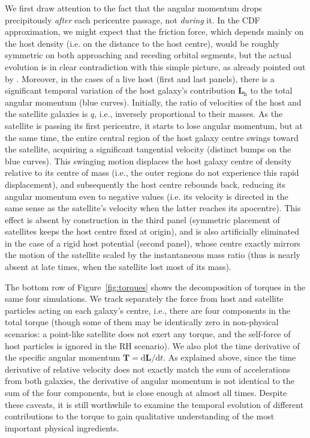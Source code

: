 \documentclass[twocolumn]{aastex63}
\newcommand{\RH}{\textsf{R\!H}\xspace}
\begin{document}
We first draw attention to the fact that the angular momentum drops precipitously \textit{after} each pericentre passage, not \textit{during} it. In the CDF approximation, we might expect that the friction force, which depends mainly on the host density (i.e. on the distance to the host centre),  would be roughly symmetric on both approaching and receding orbital segments, but the actual evolution is in clear contradiction with this simple picture, as already pointed out by \citet{Seguin1996}. Moreover, in the cases of a live host (first and last panels), there is a significant temporal variation of the host galaxy's contribution $\boldsymbol{L}_\mathrm{h}$ to the total angular momentum (blue curves). 
Initially, the ratio of velocities of the host and the satellite galaxies is $q$, i.e., inversely proportional to their masses. As the satellite is passing its first pericentre, it starts to lose angular momentum, but at the same time, the entire central region of the host galaxy centre swings toward the satellite, acquiring a significant tangential velocity (distinct bumps on the blue curves). This swinging motion displaces the host galaxy centre of density relative to its centre of mass (i.e., the outer regions do not experience this rapid displacement), and subsequently the host centre rebounds back, reducing its angular momentum even to negative values (i.e. its velocity is directed in the same sense as the satellite's velocity when the latter reaches its apocentre).
This effect is absent by construction in the third panel (symmetric placement of satellites keeps the host centre fixed at origin), and is also artificially eliminated in the case of a rigid host potential (second panel), whose centre exactly mirrors the motion of the satellite scaled by the instantaneous mass ratio (thus is nearly absent at late times, when the satellite lost most of its mass).

The bottom row of Figure~\ref{fig:torques} shows the decomposition of torques in the same four simulations. We track separately the force from host and satellite particles acting on each galaxy's centre, i.e., there are four components in the total torque (though some of them may be identically zero in non-physical scenarios: a point-like satellite does not exert any torque, and the self-force of host particles is ignored in the \RH scenario). We also plot the time derivative of the specific angular momentum $\boldsymbol T = \mathrm{d}\boldsymbol L/\mathrm{d}t$. As explained above, since the time derivative of relative velocity does not exactly match the sum of accelerations from both galaxies, the derivative of angular momentum is not identical to the sum of the four components, but is close enough at almost all times. Despite these caveats, it is still worthwhile to examine the temporal evolution of different contributions to the torque to gain qualitative understanding of the most important physical ingredients.
\end{document}
